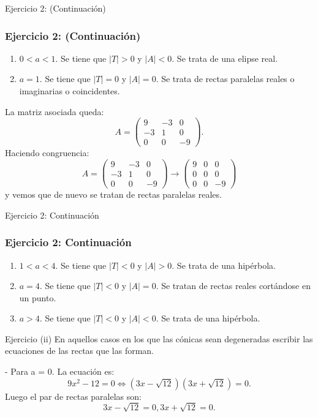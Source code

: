 \documentclass[xcolor={dvipsnames},aspectratio=169,10pt]{beamer}
\begin{document}
\begin{frame}{Ejercicio 2: (Continuación)}
  \frametitle{Ejercicio 2: (Continuación)}
  \begin{enumerate}[label=(\roman*),start=3]
    \item $0 < a < 1$. Se tiene que $|T| > 0$ y $|A| < 0$. Se trata de una elipse real.
    \item $a = 1$. Se tiene que $|T| = 0$ y $|A| = 0$. Se trata de rectas paralelas reales o imaginarias o coincidentes.
  \end{enumerate}
  La matriz asociada queda:
  \[A = \begin{pmatrix} 9 & -3 & 0 \\ -3 & 1 & 0 \\ 0 & 0 & -9 \end{pmatrix}.\]
  Haciendo congruencia:
  \[A = \begin{pmatrix} 9 & -3 & 0 \\ -3 & 1 & 0 \\ 0 & 0 & -9 \end{pmatrix} \rightarrow \begin{pmatrix} 9 & 0 & 0 \\ 0 & 0 & 0 \\ 0 & 0 & -9 \end{pmatrix}\]
  y vemos que de nuevo se tratan de rectas paralelas reales.
\end{frame}

\begin{frame}{Ejercicio 2: Continuación}
  \frametitle{Ejercicio 2: Continuación}
  \begin{enumerate}[label=(\roman*),start=5]
    \item $1 < a < 4$. Se tiene que $|T| < 0$ y $|A| > 0$. Se trata de una hipérbola.
    \item $a = 4$. Se tiene que $|T| < 0$ y $|A| = 0$. Se tratan de rectas reales cortándose en un punto.
    \item $a > 4$. Se tiene que $|T| < 0$ y $|A| < 0$. Se trata de una hipérbola.
  \end{enumerate}

  \begin{block}{Ejercicio}
  (ii) En aquellos casos en los que las cónicas sean degeneradas escribir las ecuaciones de las rectas que las forman.
  \end{block}
  - Para a = 0. La ecuación es:
  \[9x^2 - 12 = 0 \Leftrightarrow (3x - \sqrt{12})(3x + \sqrt{12}) = 0.\]
  Luego el par de rectas paralelas son:
  \[3x - \sqrt{12} = 0, 3x + \sqrt{12} = 0.\]
\end{frame}
\end{document}
